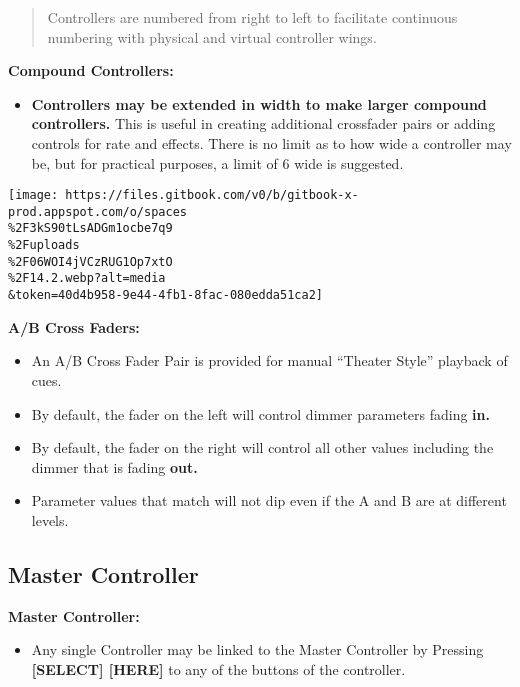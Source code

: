 \documentclass[
]{article}
\providecommand{\tightlist}{%
  \setlength{\itemsep}{0pt}\setlength{\parskip}{0pt}}
\begin{document}
\begin{quote}
Controllers are numbered from right to left to facilitate continuous numbering with physical and virtual controller wings.
\end{quote}

\textbf{Compound Controllers:}

\begin{itemize}
\tightlist
\item
  \textbf{Controllers may be extended in width to make larger compound controllers.}
  This is useful in creating additional crossfader pairs or adding controls for rate and effects.
  There is no limit as to how wide a controller may be, but for practical purposes, a limit of 6 wide is suggested.
\end{itemize}

\texttt{[image: https://files.gitbook.com/v0/b/gitbook-x-prod.appspot.com/o/spaces\\\%2F3kS90tLsADGm1ocbe7q9\\\%2Fuploads\\\%2F06WOI4jVCzRUG1Op7xtO\\\%2F14.2.webp?alt=media\\\&token=40d4b958-9e44-4fb1-8fac-080edda51ca2]}

\textbf{A/B Cross Faders:}

\begin{itemize}
\item
  An A/B Cross Fader Pair is provided for manual ``Theater Style'' playback of cues.
\item
  By default, the fader on the left will control dimmer parameters fading \textbf{in.}
\item
  By default, the fader on the right will control all other values including the dimmer that is fading \textbf{out.}
\item
  Parameter values that match will not dip even if the A and B are at different levels.
\end{itemize}

\hypertarget{master-controller-1}{%
\subsection{Master Controller}\label{master-controller-1}}

\textbf{Master Controller:}

\begin{itemize}
\tightlist
\item
  Any single Controller may be linked to the Master Controller by Pressing \textbf{{[}SELECT{]} {[}HERE{]}} to any of the buttons of the controller.
\end{itemize}
\end{document}
